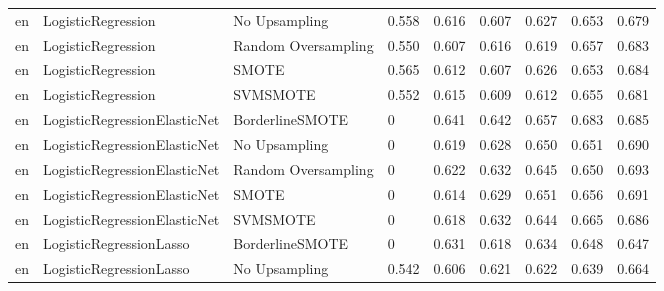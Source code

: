 \begin{tabular}{lllllllll}
      en &           LogisticRegression &       No Upsampling & 0.558 &                     0.616 &                 0.607 &                  0.627 &                                   0.653 &     0.679 \\
      en &           LogisticRegression & Random Oversampling & 0.550 &                     0.607 &                 0.616 &                  0.619 &                                   0.657 &     0.683 \\
      en &           LogisticRegression &               SMOTE & 0.565 &                     0.612 &                 0.607 &                  0.626 &                                   0.653 &     0.684 \\
      en &           LogisticRegression &            SVMSMOTE & 0.552 &                     0.615 &                 0.609 &                  0.612 &                                   0.655 &     0.681 \\
      en & LogisticRegressionElasticNet &     BorderlineSMOTE &     0 &                     0.641 &                 0.642 &                  0.657 &                                   0.683 &     0.685 \\
      en & LogisticRegressionElasticNet &       No Upsampling &     0 &                     0.619 &                 0.628 &                  0.650 &                                   0.651 &     0.690 \\
      en & LogisticRegressionElasticNet & Random Oversampling &     0 &                     0.622 &                 0.632 &                  0.645 &                                   0.650 &     0.693 \\
      en & LogisticRegressionElasticNet &               SMOTE &     0 &                     0.614 &                 0.629 &                  0.651 &                                   0.656 &     0.691 \\
      en & LogisticRegressionElasticNet &            SVMSMOTE &     0 &                     0.618 &                 0.632 &                  0.644 &                                   0.665 &     0.686 \\
      en &      LogisticRegressionLasso &     BorderlineSMOTE &     0 &                     0.631 &                 0.618 &                  0.634 &                                   0.648 &     0.647 \\
      en &      LogisticRegressionLasso &       No Upsampling & 0.542 &                     0.606 &                 0.621 &                  0.622 &                                   0.639 &     0.664 \\

\end{tabular}
